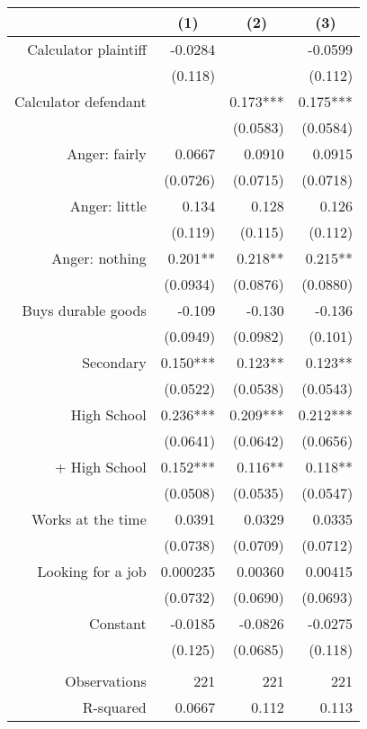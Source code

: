 \begin{tabular}{rrrr}
\toprule
      & \multicolumn{1}{c}{(1)} & \multicolumn{1}{c}{(2)} & \multicolumn{1}{c}{(3)} \\
\midrule
Calculator plaintiff & -0.0284 &       & -0.0599 \\
      & (0.118) &       & (0.112) \\
Calculator defendant &       & 0.173*** & 0.175*** \\
      &       & (0.0583) & (0.0584) \\
Anger: fairly & 0.0667 & 0.0910 & 0.0915 \\
      & (0.0726) & (0.0715) & (0.0718) \\
Anger: little & 0.134 & 0.128 & 0.126 \\
      & (0.119) & (0.115) & (0.112) \\
Anger: nothing & 0.201** & 0.218** & 0.215** \\
      & (0.0934) & (0.0876) & (0.0880) \\
Buys durable goods & -0.109 & -0.130 & -0.136 \\
      & (0.0949) & (0.0982) & (0.101) \\
Secondary & 0.150*** & 0.123** & 0.123** \\
      & (0.0522) & (0.0538) & (0.0543) \\
High School & 0.236*** & 0.209*** & 0.212*** \\
      & (0.0641) & (0.0642) & (0.0656) \\
+ High School & 0.152*** & 0.116** & 0.118** \\
      & (0.0508) & (0.0535) & (0.0547) \\
Works at the time & 0.0391 & 0.0329 & 0.0335 \\
      & (0.0738) & (0.0709) & (0.0712) \\
Looking for a job & 0.000235 & 0.00360 & 0.00415 \\
      & (0.0732) & (0.0690) & (0.0693) \\
Constant  & -0.0185 & -0.0826 & -0.0275 \\
      & (0.125) & (0.0685) & (0.118) \\
      &       &       &  \\
Observations & 221   & 221   & 221 \\
R-squared & 0.0667 & 0.112 & 0.113 \\
\bottomrule
\end{tabular}%
